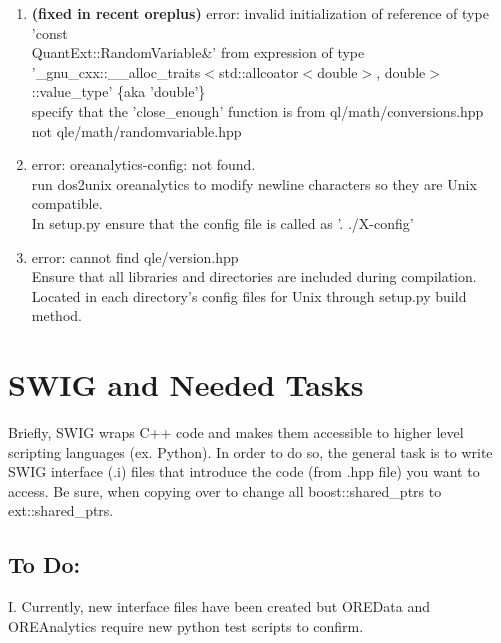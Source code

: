 \documentclass[10pt]{article}
\begin{document}
\begin{enumerate}
    \item \textbf{(fixed in recent oreplus)} error: invalid initialization of reference of type 'const \\ QuantExt::RandomVariable\&' from expression of type '\_gnu\_cxx::\_\_alloc\_traits$<$std::allcoator$<$double$>$, double$>$::value\_type' \{aka 'double'\} \\
    \-\hspace{1cm} specify that the 'close\_enough' function is from ql/math/conversions.hpp \\ \-\hspace{1cm} not qle/math/randomvariable.hpp \\

    \item error: oreanalytics-config: not found. \\
    \-\hspace{1cm} run dos2unix oreanalytics to modify newline characters so they are Unix compatible. \\ \-\hspace{1cm}In setup.py ensure that the config file is called as '. ./X-config' 

    \item error: cannot find qle/version.hpp \\
    \-\hspace{1cm} Ensure that all libraries and directories are included during compilation. \\ \-\hspace{1cm} Located in each directory's config files for Unix through setup.py build method.
    
    

\end{enumerate}

\pagebreak

\section*{SWIG and Needed Tasks}
Briefly, SWIG wraps C++ code and makes them accessible to higher level scripting languages (ex. Python). In order to do so, the general task is to write SWIG interface (.i) files that introduce the code (from .hpp file) you want to access. Be sure, when copying over to change all boost::shared\_ptrs to ext::shared\_ptrs.\\

\subsection*{To Do:}
I. Currently, new interface files have been created but OREData and OREAnalytics require new python test scripts to confirm. \\
\end{document}
